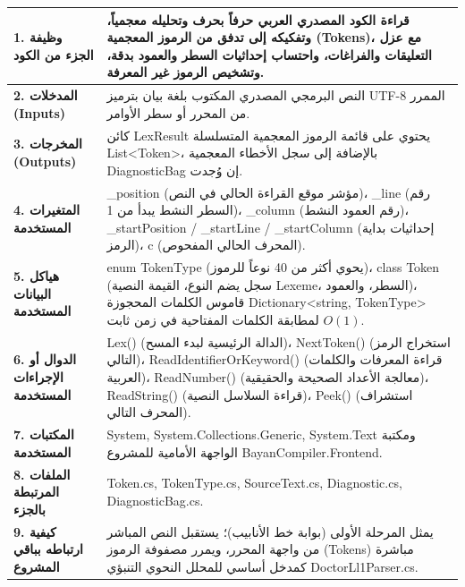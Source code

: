 \documentclass[12pt,a4paper]{report}
\begin{document}
\begin{tcolorbox}[colback=white,colframe=vscodeBlue!80!black,arc=2mm,title=\textbf{بطاقة المواصفات البرمجية للمحلل المعجمي (Lexical Analyzer Specification)}]
\begin{tabularx}{\linewidth}{p{4.2cm} X}
    \textbf{1. وظيفة الجزء من الكود} & قراءة الكود المصدري العربي حرفاً بحرف وتحليله معجمياً، وتفكيكه إلى تدفق من الرموز المعجمية (Tokens)، مع عزل التعليقات والفراغات، واحتساب إحداثيات السطر والعمود بدقة، وتشخيص الرموز غير المعرفة. \\
    \midrule
    \textbf{2. المدخلات (Inputs)} & النص البرمجي المصدري المكتوب بلغة بيان بترميز \textenglish{UTF-8} الممرر من المحرر أو سطر الأوامر. \\
    \midrule
    \textbf{3. المخرجات (Outputs)} & كائن \textenglish{LexResult} يحتوي على قائمة الرموز المعجمية المتسلسلة \textenglish{List\textless Token\textgreater}، بالإضافة إلى سجل الأخطاء المعجمية \textenglish{DiagnosticBag} إن وُجدت. \\
    \midrule
    \textbf{4. المتغيرات المستخدمة} & \textenglish{\_position} (مؤشر موقع القراءة الحالي في النص)، \textenglish{\_line} (رقم السطر النشط يبدأ من 1)، \textenglish{\_column} (رقم العمود النشط)، \textenglish{\_startPosition / \_startLine / \_startColumn} (إحداثيات بداية الرمز)، \textenglish{c} (المحرف الحالي المفحوص). \\
    \midrule
    \textbf{5. هياكل البيانات المستخدمة} & \textenglish{enum TokenType} (يحوي أكثر من 40 نوعاً للرموز)، \textenglish{class Token} (سجل يضم النوع، القيمة النصية Lexeme، السطر، والعمود)، قاموس الكلمات المحجوزة \textenglish{Dictionary\textless string, TokenType\textgreater} لمطابقة الكلمات المفتاحية في زمن ثابت $O(1)$. \\
    \midrule
    \textbf{6. الدوال أو الإجراءات المستخدمة} & \textenglish{Lex()} (الدالة الرئيسية لبدء المسح)، \textenglish{NextToken()} (استخراج الرمز التالي)، \textenglish{ReadIdentifierOrKeyword()} (قراءة المعرفات والكلمات العربية)، \textenglish{ReadNumber()} (معالجة الأعداد الصحيحة والحقيقية)، \textenglish{ReadString()} (قراءة السلاسل النصية)، \textenglish{Peek()} (استشراف المحرف التالي). \\
    \midrule
    \textbf{7. المكتبات المستخدمة} & \textenglish{System, System.Collections.Generic, System.Text} ومكتبة الواجهة الأمامية للمشروع \textenglish{BayanCompiler.Frontend}. \\
    \midrule
    \textbf{8. الملفات المرتبطة بالجزء} & \textenglish{Token.cs, TokenType.cs, SourceText.cs, Diagnostic.cs, DiagnosticBag.cs}. \\
    \midrule
    \textbf{9. كيفية ارتباطه بباقي المشروع} & يمثل المرحلة الأولى (بوابة خط الأنابيب)؛ يستقبل النص المباشر من واجهة المحرر، ويمرر مصفوفة الرموز (Tokens) مباشرة كمدخل أساسي للمحلل النحوي التنبؤي \textenglish{DoctorLl1Parser.cs}. \\
\end{tabularx}
\end{tcolorbox}
\end{document}
